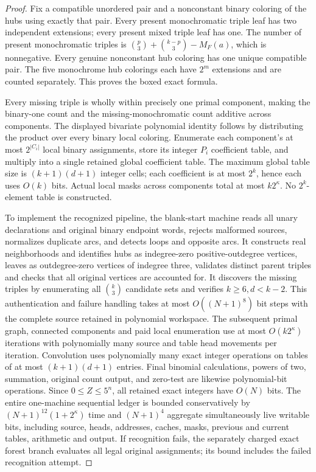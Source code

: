 \documentclass[11pt]{article}
\begin{document}
\begin{proof}
Fix a compatible unordered pair and a nonconstant binary
coloring of the hubs using exactly that pair. Every
present monochromatic triple leaf has two independent
extensions; every present mixed triple leaf has one.
The number of present monochromatic triples is
$\binom p3+\binom{k-p}3-M_F(a)$, which is nonnegative.
Every genuine nonconstant hub coloring has one unique
compatible pair. The five monochrome hub colorings each
have $2^m$ extensions and are counted separately.
This proves the boxed exact formula.

Every missing triple is wholly within precisely one
primal component, making the binary-one count and the
missing-monochromatic count additive across components.
The displayed bivariate polynomial identity follows by
distributing the product over every binary local coloring.
Enumerate each component's at most $2^{|C_i|}$ local
binary assignments, store its integer $P_i$ coefficient
table, and multiply into a single retained global
coefficient table. The maximum global table size is
$(k+1)(d+1)$ integer cells; each coefficient is at most
$2^k$, hence each uses $O(k)$ bits. Actual local masks
across components total at most $k2^\kappa$.
No $2^k$-element table is constructed.

To implement the recognized pipeline, the blank-start
machine reads all unary declarations and original
binary endpoint words, rejects malformed sources,
normalizes duplicate arcs, and detects loops and
opposite arcs. It constructs real neighborhoods and
identifies hubs as indegree-zero positive-outdegree
vertices, leaves as outdegree-zero vertices of indegree
three, validates distinct parent triples and checks that
all original vertices are accounted for. It discovers
the missing triples by enumerating all
$\binom k3$ candidate sets and verifies $k\ge6,d<k-2$.
This authentication and failure handling takes at most
$O((N+1)^8)$ bit steps with the complete source retained
in polynomial workspace. The subsequent primal graph,
connected components and paid local enumeration use at
most $O(k2^\kappa)$ iterations with polynomially many
source and table head movements per iteration.
Convolution uses polynomially many exact integer
operations on tables of at most $(k+1)(d+1)$ entries.
Final binomial calculations, powers of two, summation,
original count output, and zero-test are likewise
polynomial-bit operations. Since $0\le Z\le5^n$, all
retained exact integers have $O(N)$ bits.
The entire one-machine sequential ledger is bounded
conservatively by $(N+1)^{12}(1+2^\kappa)$ time and
$(N+1)^4$ aggregate simultaneously live writable bits,
including source, heads, addresses, caches, masks,
previous and current tables, arithmetic and output.
If recognition fails, the separately charged exact
forest branch evaluates all legal original assignments;
its bound includes the failed recognition attempt.
\end{proof}
\end{document}
